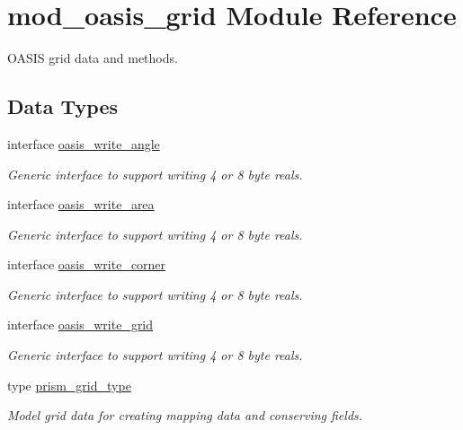 \hypertarget{classmod__oasis__grid}{\section{mod\+\_\+oasis\+\_\+grid Module Reference}
\label{classmod__oasis__grid}
}


O\+A\+S\+I\+S grid data and methods.  


\subsection*{Data Types}
\begin{DoxyCompactItemize}
\item 
interface \hyperlink{interfacemod__oasis__grid_1_1oasis__write__angle}{oasis\+\_\+write\+\_\+angle}
\begin{DoxyCompactList}\small\item\em Generic interface to support writing 4 or 8 byte reals. \end{DoxyCompactList}\item 
interface \hyperlink{interfacemod__oasis__grid_1_1oasis__write__area}{oasis\+\_\+write\+\_\+area}
\begin{DoxyCompactList}\small\item\em Generic interface to support writing 4 or 8 byte reals. \end{DoxyCompactList}\item 
interface \hyperlink{interfacemod__oasis__grid_1_1oasis__write__corner}{oasis\+\_\+write\+\_\+corner}
\begin{DoxyCompactList}\small\item\em Generic interface to support writing 4 or 8 byte reals. \end{DoxyCompactList}\item 
interface \hyperlink{interfacemod__oasis__grid_1_1oasis__write__grid}{oasis\+\_\+write\+\_\+grid}
\begin{DoxyCompactList}\small\item\em Generic interface to support writing 4 or 8 byte reals. \end{DoxyCompactList}\item 
type \hyperlink{structmod__oasis__grid_1_1prism__grid__type}{prism\+\_\+grid\+\_\+type}
\begin{DoxyCompactList}\small\item\em Model grid data for creating mapping data and conserving fields. \end{DoxyCompactList}\end{DoxyCompactItemize}

